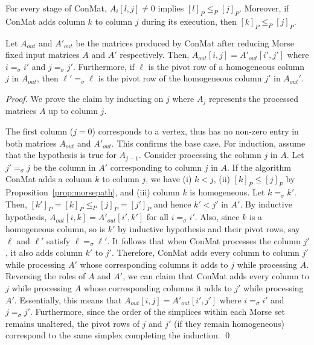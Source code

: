 \documentclass[10pt,a4paper]{amsart}
\begin{document}
\begin{prop}
    For every stage of {\sc ConMat}, $A_i[l,j]\neq 0$ implies $[l]_P\leq_P [j]_P$.
    Moreover, if {\sc ConMat} adds column $k$ to column $j$ during its execution, then
    $[k]_P\leq_P [j]_P$.
    \label{prop:morsepath}
\end{prop}

\begin{prop}
Let $A_{out}$ and $A'_{out}$ be the matrices produced by {\sc ConMat} after
reducing Morse fixed input matrices $A$ and $A'$ respectively. Then,
  $A_{out}[i,j]=A'_{out}[i',j']$ where $i=_\sigma i'$ and $j=_\sigma j'$. 
  Furthermore, if $\ell$ is the pivot row of a homogeneous column $j$ in $A_{out}$,
  then $\ell'=_\sigma \ell$ is the pivot row of the homogeneous column $j'$ in $A_{out}'$.
\label{prop:morsefixed}
\end{prop}

\begin{proof}
    We prove the claim by inducting on $j$ where $A_j$ represents
    the processed matrices $A$ up to
    column $j$.
    
    The first column ($j=0$) corresponds to a vertex,
    thus has no non-zero entry in both matrices $A_{out}$ and $A'_{out}$.
    This confirms the base case. For induction, assume that the
    hypothesis is true for $A_{j-1}$. Consider processing the column $j$
    in $A$. Let $j'=_\sigma j$ be the column in $A'$ corresponding to column
    $j$ in $A$. If the algorithm {\sc ConMat} adds a column $k$ to
    column $j$, we have (i) $k <j$,  (ii) 
    $[k]_P \leq [j]_P$
    by Proposition~\ref{prop:morsepath}, and (iii) column $k$ is homogeneous. Let $k=_\sigma k'$. Then, 
    $[k']_P=[k]_P\leq_P [j]_P=[j']_P$ 
    and hence $k'< j'$ in $A'$.
    By inductive hypothesis,
    $A_{out}[i,k]= A'_{out}[i',k']$ for all $i=_\sigma i'$.
    Also, since $k$ is a homogeneous column,
    so is $k'$ by inductive hypothesis and their pivot rows, say $\ell$ and $\ell'$
    satisfy $\ell=_\sigma \ell'$. 
    It follows that when {\sc ConMat} processes the column $j'$, it also
    adds column $k'$ to $j'$. Therefore, {\sc ConMat} adds every column 
    to column $j'$ while processing $A'$ whose corresponding columns it adds to $j$ while processing
    $A$. Reversing the roles of $A$ and $A'$, we can claim that {\sc ConMat}
    adds every column to $j$ while processing $A$ whose corresponding columns it adds to $j'$ while
    processing $A'$. Essentially, this means that $A_{out}[i,j]=A'_{out}[i',j']$
    where $i=_\sigma i'$ and $j=_\sigma j'$. Furthermore, since the order
    of the simplices within each Morse set remains unaltered, the pivot rows of $j$ and $j'$ (if they remain homogeneous) 
    correspond to the
    same simplex completing the induction. \qed
\end{proof}
\end{document}
